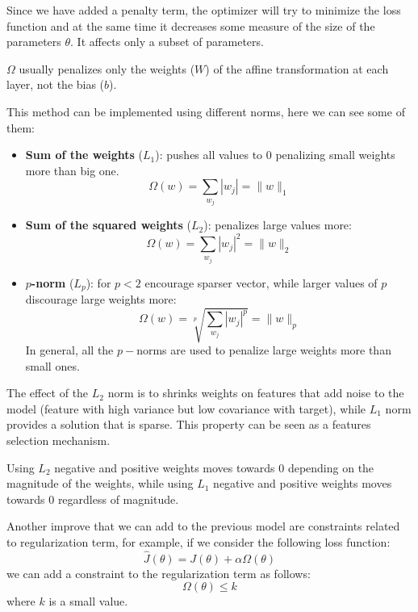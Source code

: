Since we have added a penalty term, the optimizer will try to minimize the loss
function and at the same time it decreases some measure of the size of the
parameters $\theta$. It affects only a subset of parameters.

$\Omega$ usually penalizes only the weights ($W$) of the affine transformation
at each layer, not the bias ($b$).

This method can be implemented using different norms, here we can see some of them:
\begin{itemize}
    \item \textbf{Sum of the weights} ($L_1$): pushes all values to $0$ penalizing
          small weights more than big one.
          \begin{equation}
              \Omega(w) = \sum_{w_j}|w_j| = \|w\|_1
          \end{equation}
    \item \textbf{Sum of the squared weights} ($L_2$): penalizes large values more:
          \begin{equation}
              \Omega(w) = \sum_{w_j}|w_j|^2 = \|w\|_2
          \end{equation}
    \item \textbf{$p$-norm} ($L_p$): for $p<2$ encourage sparser vector, while
          larger values of $p$ discourage large weights more:
          \begin{equation}
              \Omega(w) = \sqrt[p]{\sum_{w_j}|w_j|^p} = \|w\|_p
          \end{equation}
          In general, all the $p-$norms are used to penalize large weights more
          than small ones.
\end{itemize}

The effect of the $L_2$ norm is to shrinks weights on features that add noise to
the model (feature with high variance but low covariance with target), while
$L_1$ norm provides a solution that is sparse. This property can be seen as a
features selection mechanism.
\begin{note}
    Using $L_2$ negative and positive weights moves towards 0 depending on the
    magnitude of the weights, while using $L_1$ negative and positive weights
    moves towards 0 regardless of magnitude.
\end{note}

Another improve that we can add to the previous model are constraints related to
regularization term, for example, if we consider the following loss function:
\begin{equation}
    \hat{J}(\theta) = J(\theta) + \alpha \Omega(\theta)
\end{equation}
we can add a constraint to the regularization term as follows:
\begin{equation}
    \Omega(\theta) \le k
\end{equation}
where $k$ is a small value.

